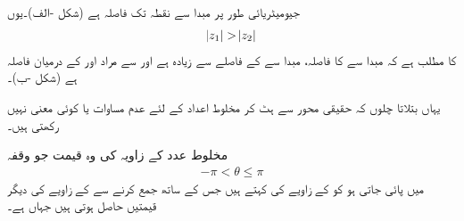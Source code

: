 جیومیٹریائی طور پر مبدا  سے نقطہ  تک فاصلہ  ہے (شکل -الف)۔یوں
\begin{align*}
\abs{z_1}>\abs{z_2}
\end{align*}
کا مطلب ہے کہ مبدا سے  کا فاصلہ، مبدا سے  کے فاصلے سے زیادہ ہے اور  سے مراد  اور  کے درمیان فاصلہ ہے  (شکل -ب)۔

یہاں بتلاتا چلوں کہ حقیقی محور سے ہٹ کر  مخلوط اعداد کے لئے عدم مساوات  یا  کوئی معنی نہیں رکھتی ہیں۔

مخلوط عدد کے زاویہ  کی وہ قیمت جو  وقفہ
\begin{align*}
-\pi <\theta \le \pi
\end{align*}
 میں پائی جاتی ہو  کو  کے زاویے کی  کہتے ہیں جس کے ساتھ  جمع  کرنے سے  کے زاویے کی دیگر قیمتیں حاصل ہوتی ہیں جہاں   ہے۔
%

